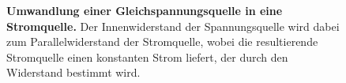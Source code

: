 {\begin{figure}[H]
\begin{minipage}{0.45\textwidth}
\begin{circuitikz}[scale=0.9]
                
            \end{circuitikz}
            
        \end{minipage}
        \caption{\textbf{Umwandlung einer Gleichspannungsquelle in eine Stromquelle.} Der Innenwiderstand der Spannungsquelle wird dabei zum Parallelwiderstand der
            Stromquelle, wobei die resultierende Stromquelle einen konstanten Strom liefert, der durch den Widerstand bestimmt wird.}
        \label{fig:Umrechnung}
        
    \end{figure}
}






